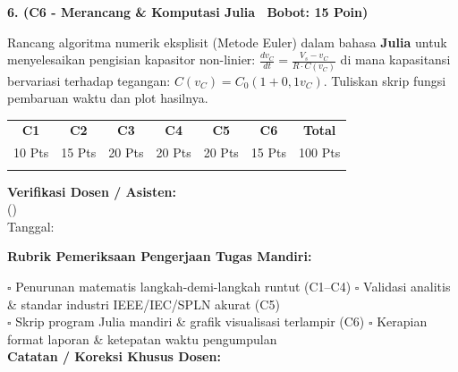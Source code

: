 \documentclass[10pt,a4paper]{article}
\begin{document}
\vspace{3.5mm}

\noindent\textbf{6. (C6 - Merancang \& Komputasi Julia \textbar\ Bobot: 15 Poin)}\par\vspace{0.8mm}
{\footnotesize Rancang algoritma numerik eksplisit (Metode Euler) dalam bahasa \textbf{Julia} untuk menyelesaikan pengisian kapasitor non-linier: $\frac{dv_C}{dt} = \frac{V_s - v_C}{R \cdot C(v_C)}$ di mana kapasitansi bervariasi terhadap tegangan: $C(v_C) = C_0 (1 + 0{,}1 v_C)$. Tuliskan skrip fungsi pembaruan waktu dan plot hasilnya.}\par

\vfill

\noindent\begin{minipage}[b]{0.62\textwidth}%
  \centering
  \scriptsize
  \begin{tabular}{|c|c|c|c|c|c|c|}
    \hline
    \rowcolor{unibblue}
    \textbf{\color{white}C1} & \textbf{\color{white}C2} & \textbf{\color{white}C3} & \textbf{\color{white}C4} & \textbf{\color{white}C5} & \textbf{\color{white}C6} & \textbf{\color{white}Total} \\
    \rowcolor{unibblue!10}
    10 Pts & 15 Pts & 20 Pts & 20 Pts & 20 Pts & 15 Pts & 100 Pts \\
    \hline
    & & & & & & \\[3mm]
    \hline
  \end{tabular}%
\end{minipage}%
\hfill%
\begin{minipage}[b]{0.35\textwidth}%
  \centering
  \scriptsize
  \textbf{Verifikasi Dosen / Asisten:}\\[6mm]
  (\dotfill)\\[1mm]
  \tiny Tanggal: \dotfill
\end{minipage}\par

\vspace{2mm}
\begin{tcolorbox}[colback=white,colframe=unibblue!40!black,colbacktitle=unibblue!10,coltitle=unibblue,boxrule=0.5pt,arc=2pt,left=5pt,right=5pt,top=3pt,bottom=3pt,title=\textbf{\tiny Catatan Evaluasi \& Umpan Balik Dosen Pengampu}]
  \tiny
  \textbf{Rubrik Pemeriksaan Pengerjaan Tugas Mandiri:}\par\vspace{0.8mm}
  $\square$ Penurunan matematis langkah-demi-langkah runtut (C1--C4) \hfill $\square$ Validasi analitis \& standar industri IEEE/IEC/SPLN akurat (C5)\\[0.8mm]
  $\square$ Skrip program Julia mandiri \& grafik visualisasi terlampir (C6) \hfill $\square$ Kerapian format laporan \& ketepatan waktu pengumpulan\\[2.0mm]
  \textbf{Catatan / Koreksi Khusus Dosen:}\\[1.6cm]
\end{tcolorbox}
\end{document}
